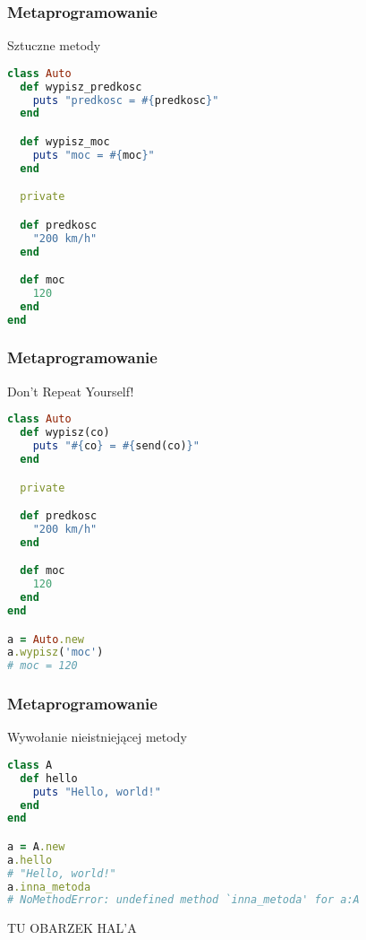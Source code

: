 \begin{frame}[fragile]
\frametitle{Metaprogramowanie}
\begin{block}{Sztuczne metody}
\begin{lstlisting}[language=Ruby]
class Auto
  def wypisz_predkosc
    puts "predkosc = #{predkosc}"
  end

  def wypisz_moc
    puts "moc = #{moc}"
  end

  private

  def predkosc
    "200 km/h"
  end

  def moc
    120
  end
end
\end{lstlisting}
\end{block}
\end{frame}
\begin{frame}[fragile]
\frametitle{Metaprogramowanie}
\begin{block}{Don't Repeat Yourself!}
\begin{lstlisting}[language=Ruby]
class Auto
  def wypisz(co)
    puts "#{co} = #{send(co)}"
  end

  private

  def predkosc
    "200 km/h"
  end

  def moc
    120
  end
end

a = Auto.new
a.wypisz('moc')
# moc = 120

\end{lstlisting}
\end{block}
\end{frame}


\begin{frame}[fragile]
\frametitle{Metaprogramowanie}
\begin{block}{Wywołanie nieistniejącej metody}
\begin{lstlisting}[language=Ruby]
class A
  def hello
    puts "Hello, world!"
  end
end

a = A.new
a.hello
# "Hello, world!"
a.inna_metoda
# NoMethodError: undefined method `inna_metoda' for a:A
\end{lstlisting}
\end{block}
\end{frame}

\begin{frame}[plain]
  TU OBARZEK HAL'A
\end{frame}

